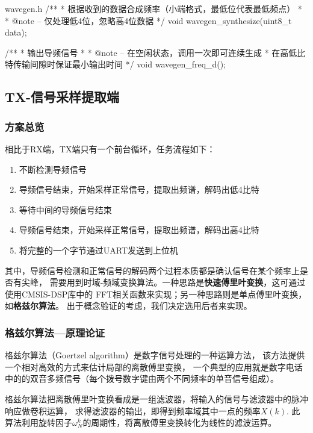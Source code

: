 \begin{cbox}{wavegen.h}
/**
 * 根据收到的数据合成频率（小端格式，最低位代表最低频点）
 *
 * @note -- 仅处理低4位，忽略高4位数据
 */
void wavegen_synthesize(uint8_t data);

/**
 * 输出导频信号
 *
 * @note -- 在空闲状态，调用一次即可连续生成
 *          在高低比特传输间隙时保证最小输出时间
 */
void wavegen_freq_d();
\end{cbox}

\subsection{TX-信号采样提取端}
\subsubsection{方案总览}
相比于RX端，TX端只有一个前台循环，任务流程如下：

\begin{enumerate}
  \item 不断检测导频信号
  \item 导频信号结束，开始采样正常信号，提取出频谱，解码出低4比特
  \item 等待中间的导频信号结束
  \item 导频信号结束，开始采样正常信号，提取出频谱，解码出高4比特
  \item 将完整的一个字节通过UART发送到上位机
\end{enumerate}

其中，导频信号检测和正常信号的解码两个过程本质都是确认信号在某个频率上是否有尖峰，
需要用到时域-频域变换算法。一种思路是\textbf{快速傅里叶变换}，这可通过使用CMSIS-DSP库中的
FFT相关函数来实现；另一种思路则是单点傅里叶变换，如\textbf{格兹尔算法}。
出于概念验证的考虑，我们决定选用后者来实现。

\subsubsection{格兹尔算法---原理论证}

格兹尔算法（Goertzel algorithm）是数字信号处理的一种运算方法，
该方法提供一个相对高效的方式来估计局部的离散傅里变换，
一个典型的应用就是数字电话中的的双音多频信号（每个拨号数字键由两个不同频率的单音信号组成）。

格兹尔算法把离散傅里叶变换看成是一组滤波器，将输入的信号与滤波器中的脉冲响应做卷积运算，
求得滤波器的输出，即得到频率域其中一点的频率$X(k)$.
此算法利用旋转因子$\omega_{N}^{k}$的周期性，将离散傅里变换转化为线性的滤波运算。


